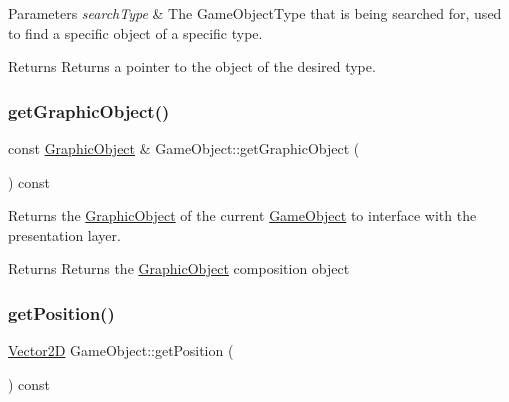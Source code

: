 \begin{DoxyParams}{Parameters}
{\em search\+Type} & The Game\+Object\+Type that is being searched for, used to find a specific object of a specific type. \\
\hline
\end{DoxyParams}
\begin{DoxyReturn}{Returns}
Returns a pointer to the object of the desired type. 
\end{DoxyReturn}
\mbox{\label{class_game_object_af44533690a46d5f41aeaa2c16bf867b9}} 
\subsubsection{\texorpdfstring{get\+Graphic\+Object()}{getGraphicObject()}}
{\footnotesize\ttfamily const \hyperlink{class_graphic_object}{Graphic\+Object} \& Game\+Object\+::get\+Graphic\+Object (\begin{DoxyParamCaption}{ }\end{DoxyParamCaption}) const\hspace{0.3cm}{\ttfamily [virtual]}}



Returns the \hyperlink{class_graphic_object}{Graphic\+Object} of the current \hyperlink{class_game_object}{Game\+Object} to interface with the presentation layer. 

\begin{DoxyReturn}{Returns}
Returns the \hyperlink{class_graphic_object}{Graphic\+Object} composition object 
\end{DoxyReturn}
\mbox{\label{class_game_object_ae3b21cc28e2c1bce6707699d0312eee8}} 
\subsubsection{\texorpdfstring{get\+Position()}{getPosition()}}
{\footnotesize\ttfamily \hyperlink{class_vector2_d}{Vector2D} Game\+Object\+::get\+Position (\begin{DoxyParamCaption}{ }\end{DoxyParamCaption}) const\hspace{0.3cm}{\ttfamily [inline]}}



